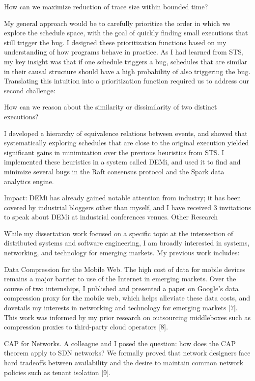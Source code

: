 	How can we maximize reduction of trace size within bounded time?

My general approach would be to carefully prioritize the order in which we explore the schedule space, with the goal of quickly finding small executions that still trigger the bug. I designed these prioritization functions based on my understanding of how programs behave in practice. As I had learned from STS, my key insight was that if one schedule triggers a bug, schedules that are similar in their causal structure should have a high probability of also triggering the bug. Translating this intuition into a prioritization function required us to address our second challenge: 

How can we reason about the similarity or dissimilarity of two distinct executions?

I developed a hierarchy of equivalence relations between events, and showed that systematically exploring schedules that are close to the original execution yielded significant gains in minimization over the previous heuristics from STS. I implemented these heuristics in a system called DEMi, and used it to find and minimize several bugs in the Raft consensus protocol and the Spark data analytics engine.

Impact: DEMi has already gained notable attention from industry; it has been covered by industrial bloggers other than myself, and I have received 3 invitations to speak about DEMi at industrial conferences venues.
Other Research

While my dissertation work focused on a specific topic at the intersection of distributed systems and software engineering, I am broadly interested in systems, networking, and technology for emerging markets. My previous work includes:

Data Compression for the Mobile Web. The high cost of data for mobile devices remains a major barrier to use of the Internet in emerging markets. Over the course of two internships, I published and presented a paper on Google’s data compression proxy for the mobile web, which helps alleviate these data costs, and dovetails my interests in networking and technology for emerging markets [7]. This work was informed by my prior research on outsourcing middleboxes such as compression proxies to third-party cloud operators [8].

CAP for Networks. A colleague and I posed the question: how does the CAP theorem apply to SDN networks? We formally proved that network designers face hard tradeoffs between availability and the desire to maintain common network policies such as tenant isolation [9].

